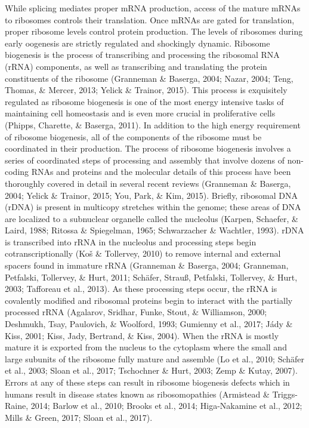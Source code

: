 \documentclass[12pt,oneside]{reedthesis}
\begin{document}
While splicing mediates proper mRNA production, access of the mature
mRNAs to ribosomes controls their translation. Once mRNAs are gated for
translation, proper ribosome levels control protein production. The
levels of ribosomes during early oogenesis are strictly regulated and
shockingly dynamic. Ribosome biogenesis is the process of transcribing
and processing the ribosomal RNA (rRNA) components, as well as
transcribing and translating the protein constituents of the ribosome
(Granneman \& Baserga, 2004; Nazar, 2004; Teng, Thomas, \& Mercer, 2013; Yelick \& Trainor, 2015). This
process is exquisitely regulated as ribosome biogenesis is one of the
most energy intensive tasks of maintaining cell homeostasis and is even
more crucial in proliferative cells (Phipps, Charette, \& Baserga, 2011). In addition to
the high energy requirement of ribosome biogenesis, all of the
components of the ribosome must be coordinated in their production. The
process of ribosome biogenesis involves a series of coordinated steps of
processing and assembly that involve dozens of non-coding RNAs and
proteins and the molecular details of this process have been thoroughly
covered in detail in several recent reviews (Granneman \& Baserga, 2004; Yelick \& Trainor, 2015; You, Park, \& Kim, 2015). Briefly, ribosomal DNA (rDNA) is present in
multicopy stretches within the genome; these areas of DNA are localized
to a subnuclear organelle called the nucleolus (Karpen, Schaefer, \& Laird, 1988; Ritossa \& Spiegelman, 1965; Schwarzacher \& Wachtler, 1993). rDNA is transcribed into rRNA in
the nucleolus and processing steps begin cotranscriptionally
(Koš \& Tollervey, 2010) to remove internal and external spacers found in immature
rRNA (Granneman \& Baserga, 2004; Granneman, Petfalski, Tollervey, \& Hurt, 2011; Schäfer, Strauß, Petfalski, Tollervey, \& Hurt, 2003; Tafforeau et al., 2013). As these processing steps occur, the rRNA is
covalently modified and ribosomal proteins begin to interact with the
partially processed rRNA (Agalarov, Sridhar, Funke, Stout, \& Williamson, 2000; Deshmukh, Tsay, Paulovich, \& Woolford, 1993; Gumienny et al., 2017; Jády \& Kiss, 2001; Kiss, Jady, Bertrand, \& Kiss, 2004). When the rRNA is mostly
mature it is exported from the nucleus to the cytoplasm where the small
and large subunits of the ribosome fully mature and assemble
(Lo et al., 2010; Schäfer et al., 2003; Sloan et al., 2017; Tschochner \& Hurt, 2003; Zemp \& Kutay, 2007). Errors at any of these steps can result in ribosome
biogenesis defects which in humans result in disease states known as
ribosomopathies (Armistead \& Triggs-Raine, 2014; Barlow et al., 2010; Brooks et al., 2014; Higa-Nakamine et al., 2012; Mills \& Green, 2017; Sloan et al., 2017).
\end{document}
